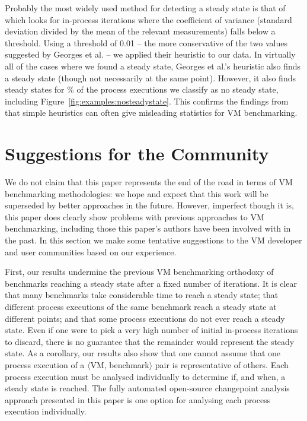 \documentclass[acmsmall]{acmart}\settopmatter{printfolios=true}
\newcommand{\vmbpair}{$\langle$VM, benchmark$\rangle$\xspace}
\begin{document}
Probably the most widely used method for detecting a steady state is that of
\citet{georges07statistically} which looks for in-process iterations where the
coefficient of variance (standard deviation divided by the mean of the relevant measurements)
falls below a threshold. Using a threshold of 0.01 -- the more
conservative of the two values suggested by Georges et al. -- we applied their
heuristic to our data. In virtually all of the cases where we found a steady
state, Georges et al.'s heuristic also finds a steady state (though not
necessarily at the same point). However, it also
finds steady states for \georgesnosteadystatepercent\% of the process executions we classify as no
steady state, including Figure~\ref{fig:examples:nosteadystate}. This confirms
the findings from \cite{kalibera13rigorous} that simple heuristics can often
give misleading statistics for VM benchmarking.


\section{Suggestions for the Community}
\label{suggestions}

We do not claim that this paper represents the end of the road in terms of VM
benchmarking methodologies: we hope and expect that this work will be superseded
by better approaches in the future. However, imperfect though it is, this paper
does clearly show problems with previous approaches to VM
benchmarking, including those this paper's authors have been involved with in the past. In this
section we make some tentative suggestions to the VM developer and user
communities based on our experience.

First, our results undermine the previous VM benchmarking orthodoxy of benchmarks
reaching a steady state after a fixed number of iterations. It is clear
that many benchmarks take considerable time to reach a
steady state; that different process executions of the same benchmark reach a
steady state at different points; and that some process executions do not ever
reach a steady state. Even if one were to pick a very high number of initial in-process
iterations to discard, there is no guarantee that the remainder
would represent the steady state. As a corollary, our results also show that one cannot assume
that one process execution of a \vmbpair pair is representative of others. Each
process execution must be analysed individually to determine if, and when, a steady state is
reached. The fully automated open-source changepoint analysis
approach presented in this paper is one option for analysing each process execution individually.
\end{document}
